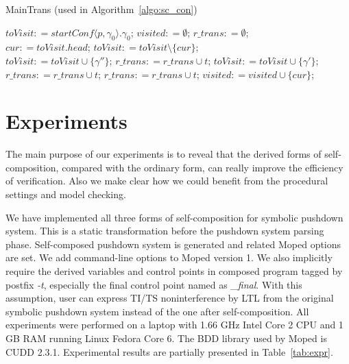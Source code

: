 \documentclass{llncs}
\begin{document}
\begin{algorithm}
\caption{\label{algo:main_trans}MainTrans (used in
Algorithm~\ref{algo:sc_con})}

$toVisit\mathrel{\mathop:}=startConf\langle p,\gamma_0\rangle.\gamma_0$; $visited\mathrel{\mathop:}=\emptyset$; $r\_trans\mathrel{\mathop:}=\emptyset$;\\
 {
    $cur\mathrel{\mathop:}=toVisit.head$; $toVisit\mathrel{\mathop:}=toVisit\setminus\{cur\}$;\\
     {
         {
            $toVisit\mathrel{\mathop:}=toVisit\cup\{\gamma''\}$; $r\_trans\mathrel{\mathop:}=r\_trans\cup t$;
        }
         {
            $toVisit\mathrel{\mathop:}=toVisit\cup\{\gamma'\}$; $r\_trans\mathrel{\mathop:}=r\_trans\cup t$;
        }
         {
            $r\_trans\mathrel{\mathop:}=r\_trans\cup t$;
        }
    }
    $visited\mathrel{\mathop:}=visited\cup\{cur\}$;
}

\end{algorithm}

\section{\label{sec:expr}Experiments}

The main purpose of our experiments is to reveal that the derived
forms of self-composition, compared with the ordinary form, can
really improve the efficiency of verification. Also we make clear
how we could benefit from the procedural settings and model
checking.

We have implemented all three forms of self-composition for symbolic
pushdown system. This is a static transformation before the pushdown
system parsing phase. Self-composed pushdown system is generated and
related Moped options are set. We add command-line options to Moped
version 1. We also implicitly require the derived variables and
control points in composed program tagged by postfix \emph{-t},
especially the final control point named as \emph{\_final}. With
this assumption, user can express TI/TS noninterference by LTL from
the original symbolic pushdown system instead of the one after
self-composition. All experiments were performed on a laptop with
1.66 GHz Intel Core 2 CPU and 1 GB RAM running Linux Fedora Core 6.
The BDD library used by Moped is CUDD 2.3.1. Experimental results
are partially presented in Table~\ref{tab:expr}.
\end{document}
